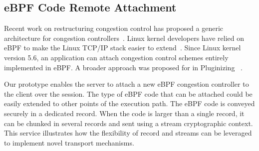 



\subsection{eBPF Code Remote Attachment}
\label{sec:prot-ebpf}

Recent work on restructuring congestion control has proposed a generic
architecture for congestion controllers~\cite{narayan2018restructuring}.
Linux kernel developers have relied on eBPF to make the Linux TCP/IP
stack easier to extend~\cite{brakmo2017tcp,tran2020beyond}. Since Linux kernel
version 5.6, an application can attach congestion control schemes
entirely implemented in eBPF. A broader approach was proposed for \quic in
Pluginizing \quic~\cite{de2019pluginizing}.

Our \tcpls prototype enables the server %
to attach a new eBPF congestion controller to the client over the \tcpls
session. The type of eBPF code that can be attached could be easily extended to other points of the \tcp execution path. The eBPF code is conveyed securely in a dedicated \tcpls record. When the code is larger than a single \tls record, it can be chunked in several records and sent using a \tcpls stream cryptographic context. This service illustrates how the flexibility of \tcpls record and streams can be leveraged to implement novel transport mechanisms.

